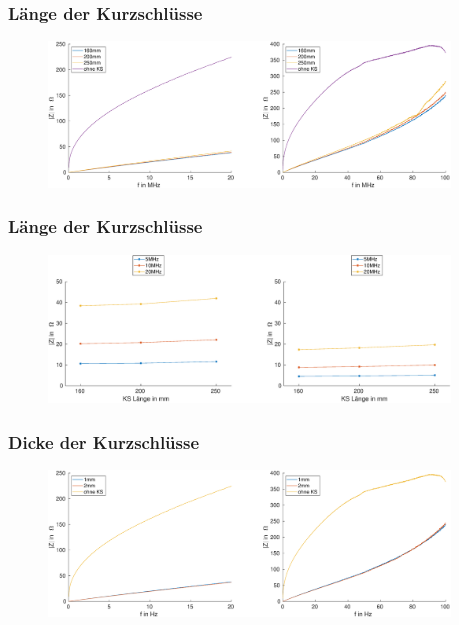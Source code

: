 \documentclass[accentcolor=tud9b, colorbacktitle, inverttitle]{tudbeamer}
\begin{document}
\begin{frame}\frametitle{Länge der Kurzschlüsse}
\vspace{-1em}
\begin{figure}[h]
	\centering
	\includegraphics[width=0.95\textwidth]{Z_RK_length_1KS}
\end{figure}
\end{frame}


\begin{frame}\frametitle{Länge der Kurzschlüsse}
\vspace{-1em}
\begin{figure}[h]
	\centering
	\includegraphics[width=0.95\textwidth]{RK_Impedanz_length_frequenz}
\end{figure}
\end{frame}



\begin{frame}\frametitle{Dicke der Kurzschlüsse}
\vspace{-1em}
\begin{figure}[h]
	\centering
	\includegraphics[width=0.95\textwidth]{Z_RK_thick_1KS}
\end{figure}
\end{frame}
\end{document}
